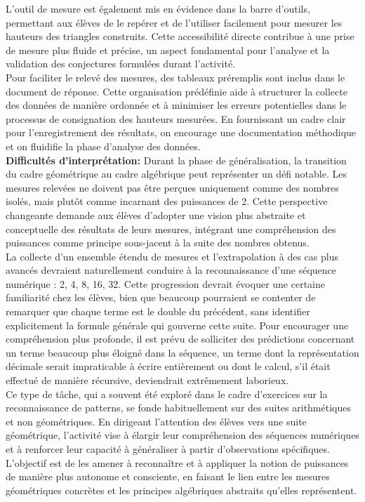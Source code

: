 L'outil de mesure est également mis en évidence dans la barre d'outils,
permettant aux élèves de le repérer et de l'utiliser facilement pour mesurer les hauteurs des triangles construits.
Cette accessibilité directe contribue à une prise de mesure plus fluide et précise,
un aspect fondamental pour l'analyse et la validation des conjectures formulées durant l'activité.\\

Pour faciliter le relevé des mesures,
des tableaux préremplis sont inclus dans le document de réponse.
Cette organisation prédéfinie aide à structurer la collecte des données de manière ordonnée et à minimiser les erreurs potentielles dans le processus de consignation des hauteurs mesurées.
En fournissant un cadre clair pour l'enregistrement des résultats,
on encourage une documentation méthodique et on fluidifie la phase d'analyse des données.\\

\textbf{Difficultés d'interprétation:}
Durant la phase de généralisation,
la transition du cadre géométrique au cadre algébrique peut représenter un défi notable.
Les mesures relevées ne doivent pas être perçues uniquement comme des nombres isolés,
mais plutôt comme incarnant des puissances de 2.
Cette perspective changeante demande aux élèves d'adopter une vision plus abstraite et conceptuelle des résultats de leurs mesures,
intégrant une compréhension des puissances comme principe sous-jacent à la suite des nombres obtenus.\\

La collecte d'un ensemble étendu de mesures et l'extrapolation à des cas plus avancés devraient naturellement conduire à la reconnaissance d'une séquence numérique :
2, 4, 8, 16, 32.
Cette progression devrait évoquer une certaine familiarité chez les élèves,
bien que beaucoup pourraient se contenter de remarquer que chaque terme est le double du précédent,
sans identifier explicitement la formule générale qui gouverne cette suite.
Pour encourager une compréhension plus profonde,
il est prévu de solliciter des prédictions concernant un terme beaucoup plus éloigné dans la séquence,
un terme dont la représentation décimale serait impraticable à écrire entièrement ou dont le calcul,
s'il était effectué de manière récursive,
deviendrait extrêmement laborieux.\\

Ce type de tâche,
qui a souvent été exploré dans le cadre d'exercices sur la reconnaissance de patterns,
se fonde habituellement sur des suites arithmétiques et non géométriques.
En dirigeant l'attention des élèves vers une suite géométrique,
l'activité vise à élargir leur compréhension des séquences numériques et à renforcer leur capacité à généraliser à partir d'observations spécifiques.
L'objectif est de les amener à reconnaître et à appliquer la notion de puissances de manière plus autonome et consciente,
en faisant le lien entre les mesures géométriques concrètes et les principes algébriques abstraits qu'elles représentent.\\

